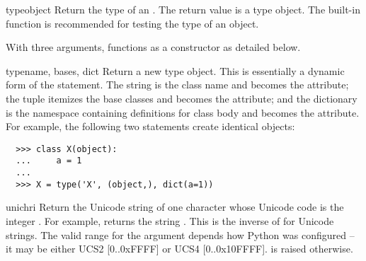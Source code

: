 \begin{funcdesc}{type}{object}
  Return the type of an .  The return value is a
  type object.  The  built-in
  function is recommended for testing the type of an object.

  With three arguments,  functions as a constructor
  as detailed below.
\end{funcdesc}

\begin{funcdesc}{type}{name, bases, dict}
  Return a new type object.  This is essentially a dynamic form of the
   statement. The  string is the class name
  and becomes the  attribute; the  tuple
  itemizes the base classes and becomes the 
  attribute; and the  dictionary is the namespace containing
  definitions for class body and becomes the 
  attribute.  For example, the following two statements create
  identical  objects:

\begin{verbatim}
  >>> class X(object):
  ...     a = 1
  ...     
  >>> X = type('X', (object,), dict(a=1))
\end{verbatim}
\end{funcdesc}

\begin{funcdesc}{unichr}{i}
  Return the Unicode string of one character whose Unicode code is the
  integer .  For example,  returns the string
  .  This is the inverse of  for Unicode
  strings.  The valid range for the argument depends how Python was
  configured -- it may be either UCS2 [0..0xFFFF] or UCS4 [0..0x10FFFF].
   is raised otherwise.
\end{funcdesc}

